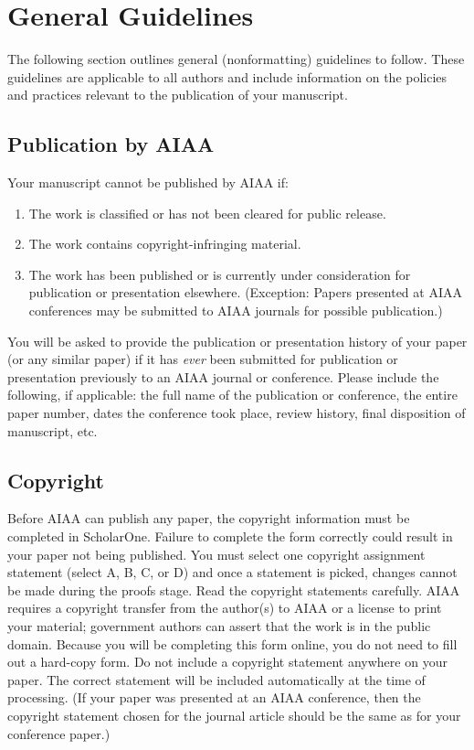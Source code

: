 \documentclass[journal]{new-aiaa}
\begin{document}
\section{General Guidelines}

The following section outlines general (nonformatting) guidelines to follow. These guidelines are applicable to all authors and include information on the policies and practices relevant to the publication of your manuscript.

\subsection{Publication by AIAA}
Your manuscript cannot be published by AIAA if:
\begin{enumerate}
\item The work is classified or has not been cleared for public release.
\item The work contains copyright-infringing material.
\item The work has been published or is currently under consideration for publication or presentation elsewhere. (Exception: Papers presented at AIAA conferences may be submitted to AIAA journals for possible publication.)
\end{enumerate}

You will be asked to provide the publication or presentation history of your paper (or any similar paper) if it has \emph{ever} been submitted for publication or presentation previously to an AIAA journal or conference. Please include the following, if applicable: the full name of the publication or conference, the entire paper number, dates the conference took place, review history, final disposition of manuscript, etc.


\subsection{Copyright}

Before AIAA can publish any paper, the copyright information must be completed in ScholarOne. Failure to complete the form correctly could result in your paper not being published. You must select one copyright assignment statement (select A, B, C, or D) and once a statement is picked, changes cannot be made during the proofs stage. Read the copyright statements carefully. AIAA requires a copyright transfer from the author(s) to AIAA or a license to print your material; government authors can assert that the work is in the public domain. Because you will be completing this form online, you do not need to fill out a hard-copy form. Do not include a copyright statement anywhere on your paper. The correct statement will be included automatically at the time of processing. (If your paper was presented at an AIAA conference, then the copyright statement chosen for the journal article should be the same as for your conference paper.)
\end{document}
